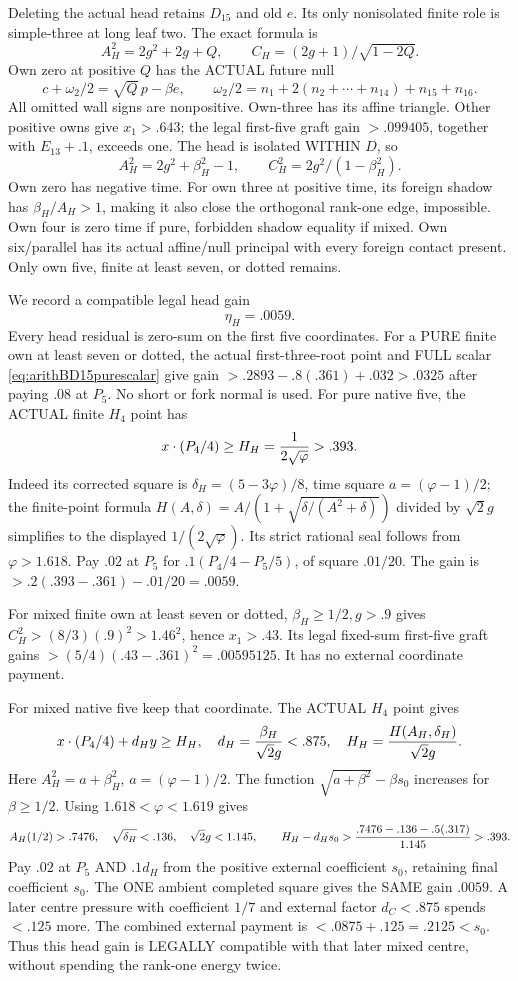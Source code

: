 \documentclass[11pt]{article}
\begin{document}
Deleting the actual head retains \(D_{15}\)
and old \(e\).
Its only nonisolated finite role is
simple-three at long leaf two.
The exact formula is
\[
 A_H^2=2g^2+2g+Q,\qquad
                      C_H=(2g+1)/\sqrt{1-2Q}.
\]
Own zero at positive \(Q\) has the
ACTUAL future null
\[
 c+\omega_2/2=\sqrt Q\,p-\beta e,\qquad
 \omega_2/2=n_1+2(n_2+\cdots+n_{14})+n_{15}+n_{16}.
\]
All omitted wall signs are nonpositive.
Own-three has its affine triangle.
Other positive owns give \(x_1>.643\);
the legal first-five graft gain \(>.099405\),
together with \(E_{13}+.1\), exceeds one.
The head is isolated WITHIN \(D\), so
\[
 A_H^2=2g^2+\beta_H^2-1,\qquad
                         C_H^2=2g^2/(1-\beta_H^2).
\]
Own zero has negative time.
For own three at positive time, its
foreign shadow has \(\beta_H/A_H>1\),
making it also close the orthogonal
rank-one edge, impossible.
Own four is zero time if pure, forbidden
shadow equality if mixed.
Own six/parallel has its actual affine/null
principal with every foreign contact present.
Only own five, finite at least seven,
or dotted remains.

We record a compatible legal head gain
\[
                                  \eta_H=.0059 .
\tag{D16OH}\label{eq:arithD16ordinaryheadgain}
\]
Every head residual is zero-sum on the
first five coordinates.
For a PURE finite own at least seven
or dotted, the actual first-three-root
point and FULL scalar
\eqref{eq:arithBD15purescalar} give gain
\(>.2893-.8(.361)+.032>.0325\)
after paying \(.08\) at \(P_5\).
No short or fork normal is used.
For pure native five, the ACTUAL finite
\(H_4\) point has
\[
 x\cdot(P_4/4)\ge H_H={1\over2\sqrt\varphi}>.393 .
\]
Indeed its corrected square is
\(\delta_H=(5-3\varphi)/8\),
time square \(a=(\varphi-1)/2\);
the finite-point formula
\(H(A,\delta)=A/(1+\sqrt{\delta/(A^2+\delta)})\)
divided by \(\sqrt2g\) simplifies to
the displayed \(1/(2\sqrt\varphi)\).
Its strict rational seal follows from
\(\varphi>1.618\).
Pay \(.02\) at \(P_5\) for
\(.1(P_4/4-P_5/5)\), of square \(.01/20\).
The gain is \(>.2(.393-.361)-.01/20=.0059\).

For mixed finite own at least seven
or dotted, \(\beta_H\ge1/2,g>.9\)
gives \(C_H^2>(8/3)(.9)^2>1.46^2\),
hence \(x_1>.43\).
Its legal fixed-sum first-five graft
gains \(>(5/4)(.43-.361)^2=.00595125\).
It has no external coordinate payment.

For mixed native five keep that coordinate.
The ACTUAL \(H_4\) point gives
\[
 x\cdot(P_4/4)+d_Hy\ge H_H,\quad
 d_H={\beta_H\over\sqrt2g}<.875,\quad
 H_H={H(A_H,\delta_H)\over\sqrt2g}.
\]
Here \(A_H^2=a+\beta_H^2\),
\(a=(\varphi-1)/2\).
The function
\(\sqrt{a+\beta^2}-\beta s_0\)
increases for \(\beta\ge1/2\).
Using \(1.618<\varphi<1.619\) gives
\[
 A_H(1/2)>.7476,\quad\sqrt{\delta_H}<.136,\quad
 \sqrt2g<1.145,\qquad
 H_H-d_Hs_0>{.7476-.136-.5(.317)\over1.145}>.393 .
\]
Pay \(.02\) at \(P_5\) AND \(.1d_H\)
from the positive external coefficient
\(s_0\), retaining final coefficient \(s_0\).
The ONE ambient completed square gives
the SAME gain \(.0059\).
A later centre pressure with coefficient
\(1/7\) and external factor \(d_C<.875\)
spends \(<.125\) more.
The combined external payment is
\(<.0875+.125=.2125<s_0\).
Thus this head gain is LEGALLY compatible
with that later mixed centre, without
spending the rank-one energy twice.
\end{document}
